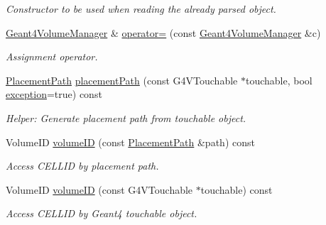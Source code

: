 \begin{DoxyCompactItemize}
\begin{DoxyCompactList}\small\item\em Constructor to be used when reading the already parsed object. \item\end{DoxyCompactList}\item 
\hyperlink{class_d_d4hep_1_1_simulation_1_1_geant4_volume_manager}{Geant4VolumeManager} \& \hyperlink{class_d_d4hep_1_1_simulation_1_1_geant4_volume_manager_abe365aa64b701feeb8ee60d4ca4fbb95}{operator=} (const \hyperlink{class_d_d4hep_1_1_simulation_1_1_geant4_volume_manager}{Geant4VolumeManager} \&c)
\begin{DoxyCompactList}\small\item\em Assignment operator. \item\end{DoxyCompactList}\item 
\hyperlink{class_d_d4hep_1_1_simulation_1_1_geant4_volume_manager_a990d8577e764541c4914263db1c6b0ca}{PlacementPath} \hyperlink{class_d_d4hep_1_1_simulation_1_1_geant4_volume_manager_a5ac0311138047aaf8633ba7e59a266d8}{placementPath} (const G4VTouchable $\ast$touchable, bool \hyperlink{classstd_1_1exception}{exception}=true) const 
\begin{DoxyCompactList}\small\item\em Helper: Generate placement path from touchable object. \item\end{DoxyCompactList}\item 
VolumeID \hyperlink{class_d_d4hep_1_1_simulation_1_1_geant4_volume_manager_a5d46621e24295850107f3c71891e685d}{volumeID} (const \hyperlink{class_d_d4hep_1_1_simulation_1_1_geant4_volume_manager_a990d8577e764541c4914263db1c6b0ca}{PlacementPath} \&path) const 
\begin{DoxyCompactList}\small\item\em Access CELLID by placement path. \item\end{DoxyCompactList}\item 
VolumeID \hyperlink{class_d_d4hep_1_1_simulation_1_1_geant4_volume_manager_a7e0058f093af6e650c02d182818e6cbb}{volumeID} (const G4VTouchable $\ast$touchable) const 
\begin{DoxyCompactList}\small\item\em Access CELLID by Geant4 touchable object. \item\end{DoxyCompactList}\item 

\end{DoxyCompactItemize}
